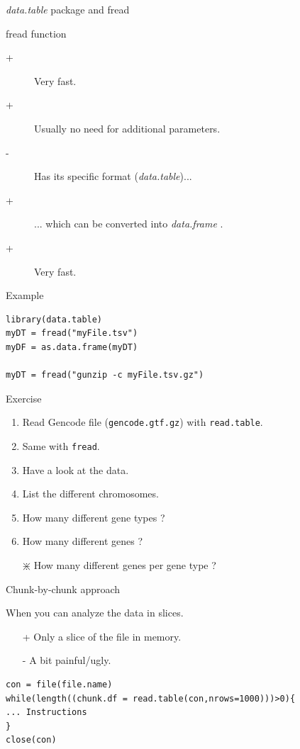 \documentclass[10pt]{beamer}
\newcommand{\df}{{\it data.frame} }
\begin{document}
\begin{frame}[fragile]{{\it data.table} package and {\sf fread}}
  \begin{block}{{\sf fread} function}
    \begin{description}
    \item[+] Very fast.
    \item[+] Usually no need for additional parameters.
    \item[-] Has its specific format ({\it data.table})...
    \item[+] ... which can be converted into \df.
    \item[+] Very fast.
    \end{description}
  \end{block}
  \begin{exampleblock}{Example}
    \begin{lstlisting}
library(data.table)
myDT = fread("myFile.tsv")
myDF = as.data.frame(myDT)

myDT = fread("gunzip -c myFile.tsv.gz")
\end{lstlisting}
  \end{exampleblock}
\end{frame}

\begin{frame}[fragile]{Exercise}
  \begin{enumerate}
  \item Read Gencode file (\verb!gencode.gtf.gz!) with \verb!read.table!.
  \item Same with \verb!fread!.
  \item Have a look at the data.
  \item List the different chromosomes.
  \item How many different gene types ?
  \item How many different genes ?
  \item[$\divideontimes$] How many different genes per gene type ?
  \end{enumerate}
\end{frame}

\begin{frame}[fragile]{Chunk-by-chunk approach}
  \begin{block}{}
    When you can analyze the data in slices.
    \bigskip
    \begin{itemize}
    \item[+] Only a slice of the file in memory.
    \item[-] A bit painful/ugly.
    \end{itemize}
  \end{block}
\bigskip

\begin{block}{}
  \begin{lstlisting}
con = file(file.name)
while(length((chunk.df = read.table(con,nrows=1000)))>0){
... Instructions
}
close(con)
\end{lstlisting}
\end{block}
\end{frame}
\end{document}
